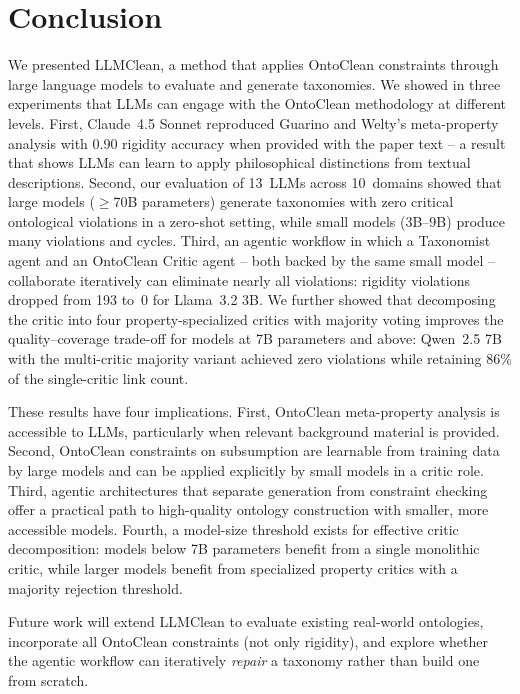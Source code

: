 \documentclass{IOS-Book-Article}
\begin{document}
\section{Conclusion}

We presented LLMClean, a method that applies OntoClean constraints
through large language models to evaluate and generate taxonomies.  We
showed in three experiments that LLMs can engage with the OntoClean
methodology at different levels.  First, Claude~4.5 Sonnet reproduced
Guarino and Welty's meta-property analysis with 0.90 rigidity accuracy
when provided with the paper text -- a result that shows LLMs can
learn to apply philosophical distinctions from textual descriptions.
Second, our evaluation of 13~LLMs across 10~domains showed that large
models ($\geq$70B parameters) generate taxonomies with zero critical
ontological violations in a zero-shot setting, while small models
(3B--9B) produce many violations and cycles.  Third, an agentic
workflow in which a Taxonomist agent and an OntoClean Critic agent --
both backed by the same small model -- collaborate iteratively can
eliminate nearly all violations: rigidity violations dropped from 193
to~0 for Llama~3.2 3B.  We further showed that decomposing the critic
into four property-specialized critics with majority voting improves
the quality--coverage trade-off for models at 7B parameters and above:
Qwen~2.5 7B with the multi-critic majority variant achieved zero
violations while retaining 86\% of the single-critic link count.

These results have four implications.  First, OntoClean meta-property
analysis is accessible to LLMs, particularly when relevant background
material is provided.  Second, OntoClean constraints on subsumption
are learnable from training data by large models and can be applied
explicitly by small models in a critic role.  Third, agentic
architectures that separate generation from constraint checking offer
a practical path to high-quality ontology construction with smaller,
more accessible models.  Fourth, a model-size threshold exists for
effective critic decomposition: models below 7B parameters benefit
from a single monolithic critic, while larger models benefit from
specialized property critics with a majority rejection threshold.

Future work will extend LLMClean to evaluate existing real-world
ontologies, incorporate all OntoClean constraints (not only rigidity),
and explore whether the agentic workflow can iteratively \emph{repair}
a taxonomy rather than build one from scratch.
\end{document}
